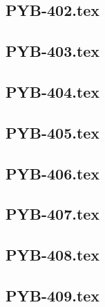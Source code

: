 \renewcommand{\xxexo}{PYB-402.tex} 
\subsection*{\xxexo} 
\graphicspath{{../../exos/python_bases/PYB-402/}}
 
 
\renewcommand{\xxexo}{PYB-403.tex} 
\subsection*{\xxexo} 
\graphicspath{{../../exos/python_bases/PYB-403/}}
 
 
\renewcommand{\xxexo}{PYB-404.tex} 
\subsection*{\xxexo} 
\graphicspath{{../../exos/python_bases/PYB-404/}}
 
 
\renewcommand{\xxexo}{PYB-405.tex} 
\subsection*{\xxexo} 
\graphicspath{{../../exos/python_bases/PYB-405/}}
 
 
\renewcommand{\xxexo}{PYB-406.tex} 
\subsection*{\xxexo} 
\graphicspath{{../../exos/python_bases/PYB-406/}}
 
 
\renewcommand{\xxexo}{PYB-407.tex} 
\subsection*{\xxexo} 
\graphicspath{{../../exos/python_bases/PYB-407/}}
 
 
\renewcommand{\xxexo}{PYB-408.tex} 
\subsection*{\xxexo} 
\graphicspath{{../../exos/python_bases/PYB-408/}}
 
 
\renewcommand{\xxexo}{PYB-409.tex} 
\subsection*{\xxexo} 
\graphicspath{{../../exos/python_bases/PYB-409/}}
 
 
